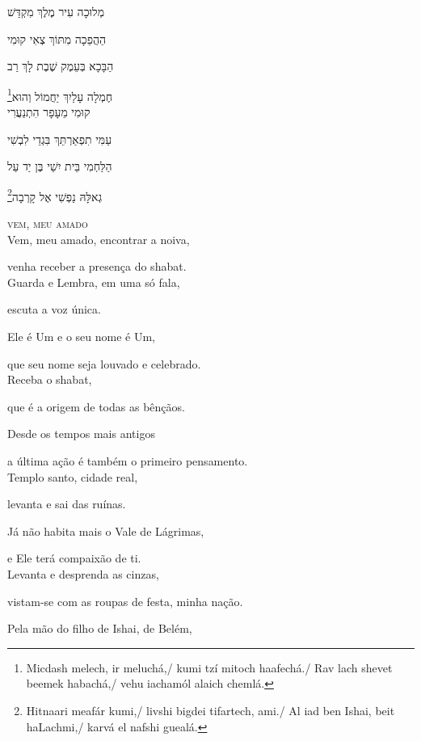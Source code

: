 מְלוּכָה עִיר מֶלֶךְ  מִקְדַּשׁ

הַהֲפֵכָה מִתּוֹךְ צְאִי קוּמִי 

הַבָּכָא בְּעֵמֶק שֶׁבֶת  לָךְ רַב

\footnote{Micdash melech, ir meluchá,/ kumi tzí mitoch haafechá./ Rav lach shevet beemek habachá,/ vehu iachamól alaich chemlá.}חֶמְלָה עָלַיִךְ יַחֲמוֹל  וְהוּא\\[10pt]

קוּמִי מֵעָפָר הִתְנַעֲרִי

עַמִּי תִפְאַרְתֵּךְ בִּגְדֵי לִבְשִׁי 

הַלַּחְמִי בֵּית יִשַׁי בֶּן יַד עַל

\footnote{Hitnaari meafár kumi,/ livshi bigdei tifartech, ami./ Al iad ben Ishai, beit haLachmi,/ karvá el nafshi guealá.}גְאלָּהּ נַפְשִׁי אֶל קָרְבָה\\[10pt]


\movetooddpage
\raggedright

\vspace*{1cm}
\textsc{vem, meu amado}\\[15pt]


Vem, meu amado, encontrar a noiva,

venha receber a presença do shabat.\\[10pt]

Guarda e Lembra, em uma só fala,

escuta a voz única.

Ele é Um e o seu nome é Um,

que seu nome seja louvado e celebrado.\\[10pt]

Receba o shabat,

que é a origem de todas as bênçãos.

Desde os tempos mais antigos

a última ação é também o primeiro pensamento.\\[10pt]

Templo santo, cidade real,

levanta e sai das ruínas.

Já não habita mais o Vale de Lágrimas,

e Ele terá compaixão de ti.\\[10pt]

Levanta e desprenda as cinzas,

vistam-se com as roupas de festa, minha nação.

Pela mão do filho de Ishai, de Belém,

